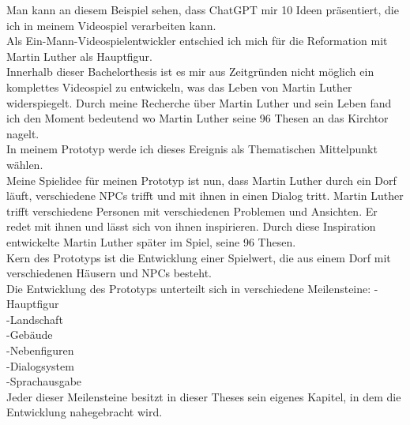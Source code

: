 \documentclass[10pt,a4paper,bibliography=totocnumbered,listof=totocnumbered]{scrartcl}
\begin{document}
Man kann an diesem Beispiel sehen, dass ChatGPT mir 10 Ideen präsentiert, die ich in meinem Videospiel verarbeiten kann.
\\
Als Ein-Mann-Videospielentwickler entschied ich mich für die Reformation mit Martin Luther als Hauptfigur.
\\
Innerhalb dieser Bachelorthesis ist es mir aus Zeitgründen nicht möglich ein komplettes Videospiel zu entwickeln, was das Leben von Martin Luther widerspiegelt. Durch meine Recherche über Martin Luther und sein Leben fand ich den Moment bedeutend wo Martin Luther seine 96 Thesen an das Kirchtor nagelt.
\\
In meinem Prototyp werde ich dieses Ereignis als Thematischen Mittelpunkt wählen.
\\
Meine Spielidee für meinen Prototyp ist nun, dass Martin Luther durch ein Dorf läuft, verschiedene NPCs trifft und mit ihnen in einen Dialog tritt. Martin Luther trifft verschiedene Personen mit verschiedenen Problemen und Ansichten. Er redet mit ihnen und lässt sich von ihnen inspirieren. Durch diese Inspiration entwickelte Martin Luther später im Spiel, seine 96 Thesen.
\\
Kern des Prototyps ist die Entwicklung einer Spielwert, die aus einem Dorf mit verschiedenen Häusern und NPCs besteht.
\\
Die Entwicklung des Prototyps unterteilt sich in verschiedene Meilensteine:
-Hauptfigur
\\
-Landschaft
\\
-Gebäude
\\
-Nebenfiguren
\\
-Dialogsystem
\\
-Sprachausgabe
\\
Jeder dieser Meilensteine besitzt in dieser Theses sein eigenes Kapitel, in dem die Entwicklung nahegebracht wird.
\end{document}
